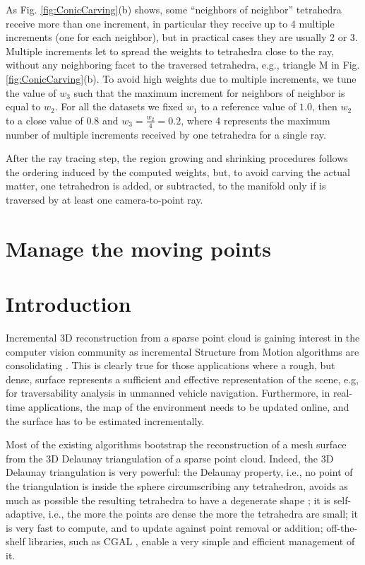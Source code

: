 As Fig. \ref{fig:ConicCarving}(b) shows, some ``neighbors of neighbor'' tetrahedra receive more than one increment, in particular they receive up to 4 multiple increments (one for each neighbor), but in practical cases they are usually 2 or 3.
Multiple increments let to spread the weights to tetrahedra close to the ray, without any  neighboring facet to the traversed tetrahedra, e.g.,  triangle M in Fig. \ref{fig:ConicCarving}(b).
To avoid high weights due to multiple increments, we tune the value of $w_3$ such that the maximum increment for neighbors of neighbor is equal to $w_2$.
For all the datasets we fixed $w_1$ to a reference value of $1.0$, then $w_2$ to a close value of $0.8$ and $w_3 = \frac{w_2}{4} = 0.2$, where 4 represents the maximum number of multiple increments received by one tetrahedra for a single ray. 


After the ray tracing step, the region growing and shrinking procedures follows the ordering induced by the computed weights, but, to avoid carving the actual matter, one tetrahedron is added, or subtracted, to the manifold only if is traversed by at least one camera-to-point ray.










\section{Manage the moving points}
\section{Introduction}
\label{sec:intro_ch5b}
Incremental 3D reconstruction from a sparse point cloud is gaining interest in the computer vision community as incremental Structure from Motion algorithms are consolidating  \cite{wu13}. 
This is clearly true for those applications where a rough, but dense, surface represents a sufficient and effective representation of the scene, e.g, for traversability analysis in unmanned vehicle navigation. 
Furthermore, in real-time applications, the map of the environment needs to be updated online, and the surface has to be estimated incrementally. 

Most of the existing algorithms \cite{Lovi_et_al_11,Pan_et_al09,litvinov_lhuillier_13,litvinov_Lhiuller14} bootstrap the reconstruction of a mesh surface from the 3D Delaunay triangulation of a sparse point cloud. Indeed, the 3D Delaunay triangulation  is very powerful:
the Delaunay property, i.e., no point of the triangulation is inside the sphere circumscribing any tetrahedron, avoids as much as possible the resulting tetrahedra to have a degenerate shape \cite{Maur_02}; it is self-adaptive, i.e., the more the points are dense the more the tetrahedra are small; it is very fast to compute, and to  update against point removal or addition; off-the-shelf libraries, such as CGAL \cite{cgal}, enable a very simple and efficient management of it. 

